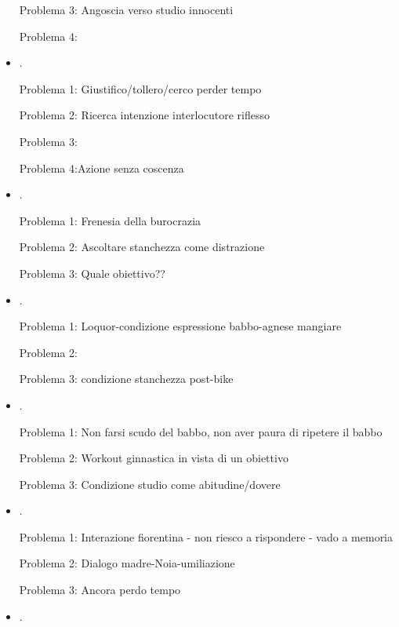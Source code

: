 \begin{itemize}
Problema 3: Angoscia verso studio innocenti

Problema 4: 


\item {}.

Problema 1: Giustifico/tollero/cerco perder tempo

Problema 2: Ricerca intenzione interlocutore riflesso

Problema 3: 

Problema 4:Azione senza coscenza

\item {}.

Problema 1: Frenesia della burocrazia

Problema 2: Ascoltare stanchezza come distrazione

Problema 3: Quale obiettivo??

\item {}.

Problema 1: Loquor-condizione espressione babbo-agnese mangiare

Problema 2: 

Problema 3: condizione stanchezza post-bike

\item {}.

Problema 1: Non farsi scudo del babbo, non aver paura di ripetere il babbo


Problema 2: Workout ginnastica in vista di un obiettivo

Problema 3: Condizione studio come abitudine/dovere

\item {}.

Problema 1: Interazione fiorentina - non riesco a rispondere - vado a memoria

Problema 2: Dialogo madre-Noia-umiliazione

Problema 3: Ancora perdo tempo

\item {}.


\end{itemize}
